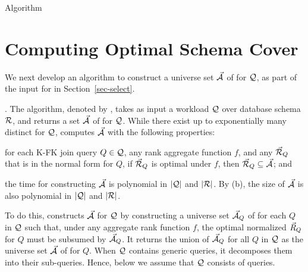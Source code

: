 {\begin{myfloat}[t]
\begin{minipage}{0.50\textwidth}
{\begin{algorithm}[H]
\nonl{}
\nonl{}
\vspace{0.3cm}
\nonl{}
\nonl {}
\caption{Algorithm \usc\label{alg-usc}} 
\end{algorithm}
\DecMargin{1em}
}
\end{minipage}
\vspace{-2.4ex}
\end{myfloat}



\section{Computing Optimal Schema Cover}
\label{sec-cover}

We next develop an algorithm to construct a universe set
$\vec{{\mathcal A}}$ of \bss for $\mathcal Q$, as part of the input for \opts in
Section~\ref{sec-select}.

. The algorithm, denoted by \usc, takes as input a workload $\mathcal Q$
over database schema ${\mathcal R}$, and returns a set $\vec{{\mathcal A}}$ of \bss
for $\mathcal Q$.
While there exist up to exponentially many distinct \bss for
$\mathcal Q$, \usc computes $\vec{{\mathcal A}}$ with the following properties:
\bi
\item[(a)] for each K-FK join \SPC query $Q\in \mathcal Q$, any rank aggregate function $f$,
  and any \bds $\vec{{\mathcal R}}_{Q}$ that is in the normal form for $Q$,
  if $\vec{{\mathcal R}}_{Q}$ is optimal under $f$, then
  $\vec{{\mathcal R}}_{Q}\subseteq \vec{{\mathcal A}}$; and
\item[(b)] the time for constructing $\vec{{\mathcal A}}$ is polynomial in
  $|\mathcal Q|$ and $|{\mathcal R}|$.
\ei
By (b), the size of $\vec{{\mathcal A}}$ is also polynomial in
$|\mathcal Q|$ and $|{\mathcal R}|$.

To do this, \usc constructs $\vec{{\mathcal A}}$ for $\mathcal Q$ by
constructing a universe set $\vec{{\mathcal A}}_{Q}$ of \bss for each $Q$ in $\mathcal Q$
such that, under any aggregate rank function $f$, the optimal
normalized \bds $\vec{R}_{Q}$ for $Q$ must be subsumed by $\vec{{\mathcal A}}_{Q}$.
It returns the union of $\vec{{\mathcal A}}_{Q}$ for all $Q$ in $\mathcal Q$ as
the universe set $\vec{{\mathcal A}}$ of \bss for $Q$. When $\mathcal Q$ contains
generic \SQL queries, it decomposes them into their \SPC
sub-queries. Hence, below we assume that $\mathcal Q$ consists of \SPC queries.

}
